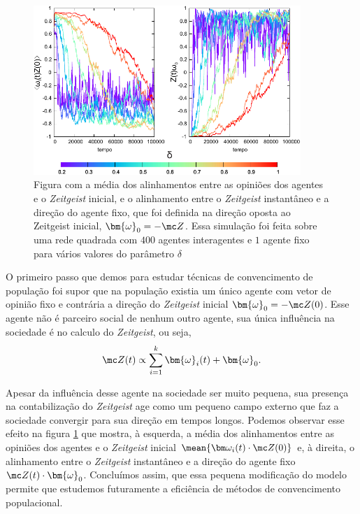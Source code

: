 \begin{figure}
\centering
\includegraphics[width=0.9\textwidth]{Figures/evolveAngulosInit}
\caption{Figura com a média dos alinhamentos entre as opiniões dos agentes
e o \textit{Zeitgeist} inicial, e o alinhamento entre o \textit{Zeitgeist}
instantâneo e a direção do agente fixo, que foi definida na direção
oposta ao Zeitgeist inicial, $\bm{\omega}_0 = - \mc Z$. Essa simulação
foi feita sobre uma rede quadrada com $400$ agentes interagentes e $1$ agente
fixo para vários valores do parâmetro $\delta$} \label{fig:evolveAngulosInit}
\end{figure}


O primeiro passo que demos para estudar técnicas de convencimento de
população foi supor que na população existia um único agente com vetor de
opinião fixo e contrária a direção do \textit{Zeitgeist} inicial
$\bm{\omega}_0 = - \mc Z(0)$.  Esse agente não é parceiro social de
nenhum outro agente, sua  única influência na sociedade é no calculo do
\textit{Zeitgeist}, ou seja,
\begin{equation}
    \mc Z(t) \propto  \sum_{i=1}^k \bm{\omega}_i(t) + \bm{\omega}_0.
\end{equation}

Apesar da influência desse agente na sociedade ser muito pequena, sua
presença na contabilização do \textit{Zeitgeist} age como um pequeno
campo externo que faz a sociedade convergir para sua direção em tempos
longos. Podemos observar esse efeito na figura \ref{fig:evolveAngulosInit} que
mostra, à esquerda, a média dos alinhamentos entre as opiniões dos agentes e o
\textit{Zeitgeist} inicial $\mean{\bm \omega_i(t)\cdot\mc Z(0)}$ e, à direita,
o alinhamento entre o \textit{Zeitgeist} instantâneo e a direção do agente
fixo $\mc Z(t) \cdot \bm{\omega}_0$.  Concluímos assim, que essa pequena
modificação do modelo permite que estudemos futuramente a eficiência
de métodos de convencimento populacional.


